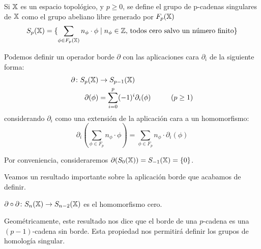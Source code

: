 \begin{definition}
  Si ${\mathbb X}$ es un espacio topológico, y $p \geq 0$, se define el grupo de p-cadenas singulares de ${\mathbb X}$
  como el grupo abeliano libre generado por $F_{p}({\mathbb X})$
  \[ S_p({\mathbb X}) = \{\sum_{\phi \in F_{p}({\mathbb X})} n_\phi \cdot \phi  \mid n_\phi \in \mathbb{Z} \text{, todos cero salvo un número finito} \}\]

  Podemos definir un operador borde $\partial$ con las aplicaciones cara $\partial_i$ de la siguiente forma:
  \begin{align*}
    \partial \colon S_p({\mathbb X}) &\to S_{p-1}({\mathbb X})\\
    \partial(\phi) &= \sum_{i = 0}^p (-1)^i \partial_i(\phi)  \hspace{1cm} (p \geq 1)
  \end{align*}
  considerando $\partial_i$ como una extensión de la aplicación cara a un homomorfismo:
  \[\partial_i(\sum_{\phi \in F_p} n_\phi \cdot \phi) = \sum_{\phi \in F_p} n_\phi \cdot \partial_i(\phi) \]
\end{definition}

Por conveniencia, consideraremos $\partial(S_0({\mathbb X})) = S_{-1}({\mathbb X}) = \{0\}$.


Veamos un resultado importante sobre la aplicación borde que acabamos de definir.

\begin{proposition}
  $\partial \circ \partial \colon S_{n}({\mathbb X}) \to S_{n-2}({\mathbb X})$ es el homomorfismo cero.
\end{proposition}

Geométricamente, este resultado nos dice que el borde de una $p$-cadena es una $(p-1)$-cadena sin
borde. Esta propiedad nos permitirá definir los grupos de homología singular.

